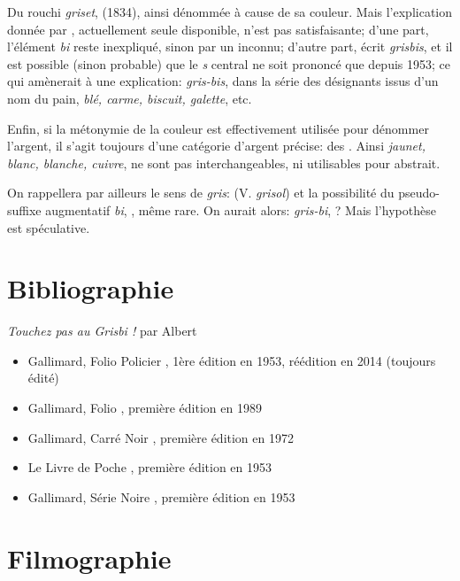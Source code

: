Du rouchi \emph{griset},  (1834), ainsi dénommée à cause de sa couleur. Mais l'explication donnée par , actuellement seule disponible, n'est pas satisfaisante; d'une part, l'élément \emph{bi} reste inexpliqué, sinon par un  inconnu; d'autre part,  écrit \emph{grisbis}, et il est possible (sinon probable) que le \emph{s} central ne soit prononcé que depuis 1953; ce qui amènerait à une explication: \emph{gris-bis}, dans la série des désignants issus d'un nom du pain, \emph{blé, carme, biscuit, galette}, etc.

Enfin, si la métonymie de la couleur est effectivement utilisée pour dénommer l'argent, il s'agit toujours d'une catégorie d'argent précise: des . Ainsi \emph{jaunet, blanc, blanche, cuivre}, ne sont pas interchangeables, ni utilisables pour  abstrait.

On rappellera par ailleurs le sens de \emph{gris}:  (V. \emph{grisol}) et la possibilité du pseudo-suffixe augmentatif \emph{bi}, , même rare. On aurait alors: \emph{gris-bi}, ? Mais l'hypothèse est spéculative.


\section{Bibliographie\label{preamble-biblio}}


\emph{Touchez pas au Grisbi !} par Albert 

\begin{itemize}
	\item Gallimard, Folio Policier , 1ère édition en 1953, réédition en 2014 (toujours édité)
	\item Gallimard, Folio , première édition en 1989
	\item Gallimard, Carré Noir , première édition en 1972
	\item Le Livre de Poche , première édition en 1953
	\item Gallimard, Série Noire , première édition en 1953
\end{itemize}


\section{Filmographie\label{preamble-filmography}}



